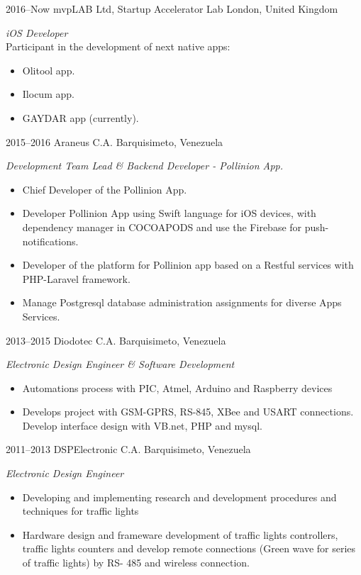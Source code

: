 \documentclass[a4paper,nocolors]{cv-friggeri-x}
\begin{document}
\begin{entrylist}

\entry
{2016--Now}
{mvpLAB Ltd, Startup Accelerator Lab}
{London, United Kingdom}
{\emph{ iOS Developer} \\
Participant in the development of next native apps:
\begin{itemize}
\item Olitool app.
\item Ilocum app.
\item GAYDAR app (currently).
\end{itemize}}

\entry
{2015--2016}
{Araneus C.A.}
{Barquisimeto, Venezuela}
{\emph{Development Team Lead  \& Backend Developer - Pollinion App.}
\begin{itemize}
\item Chief Developer of the Pollinion App.
\item Developer Pollinion App using Swift language for iOS devices, with dependency manager
in COCOAPODS and use the Firebase for push-notifications.
\item Developer of the platform for Pollinion app based on a Restful services with PHP-Laravel
framework.
\item Manage Postgresql database administration assignments for diverse Apps Services.
\end{itemize}}


\entry
{2013--2015}
{Diodotec C.A.}
{Barquisimeto, Venezuela}
{\emph{Electronic Design Engineer \& Software Development}
\begin{itemize}
\item Automations process with PIC, Atmel, Arduino and Raspberry devices
\item Develops project with GSM-GPRS, RS-845, XBee and USART connections. Develop interface design with VB.net, PHP and mysql.
\end{itemize}}


\entry
{2011--2013}
{DSPElectronic C.A.}
{Barquisimeto, Venezuela}
{\emph{ Electronic Design Engineer } 
\begin{itemize}
\item Developing and implementing research and development procedures and techniques
for traffic lights
\item Hardware design and frameware development of traffic lights controllers, traffic lights
counters and develop remote connections (Green wave for series of traffic lights) by RS-
485 and wireless connection.
\end{itemize}}


\end{entrylist}
\end{document}
